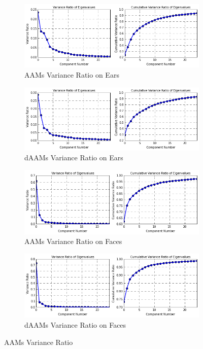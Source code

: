 \begin{figure}[h]
    \centering
    \begin{subfigure}[b]{0.5\textwidth}
            \includegraphics[width=\textwidth]{supports/Model_Analysis/ear_aam_eigen_shape}
        \caption{AAMs Variance Ratio on Ears}
    \end{subfigure}
    \begin{subfigure}[b]{0.5\textwidth}
            \includegraphics[width=\textwidth]{supports/Model_Analysis/ear_of_eigen_shape}
        \caption{dAAMs Variance Ratio on Ears}
    \end{subfigure}
    \begin{subfigure}[b]{0.5\textwidth}
            \includegraphics[width=\textwidth]{supports/Model_Analysis/face_aam_eigen_shape}
        \caption{AAMs Variance Ratio on Faces}
    \end{subfigure}
    \begin{subfigure}[b]{0.5\textwidth}
            \includegraphics[width=\textwidth]{supports/Model_Analysis/face_of_eigen_shape}
        \caption{dAAMs Variance Ratio on Faces}
    \end{subfigure}
    \caption{AAMs Variance Ratio}
    \label{fig:compact}
\end{figure}


